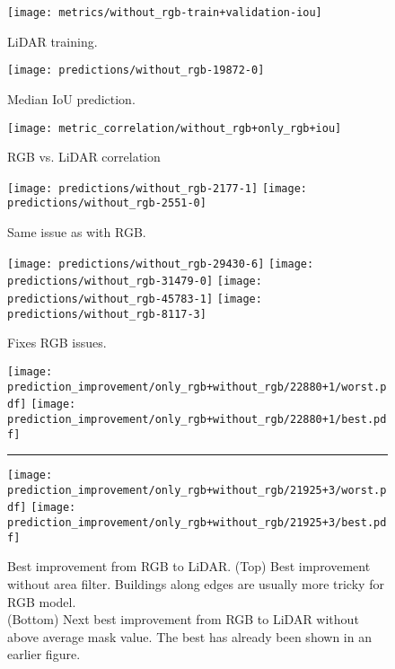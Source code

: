 \begin{figure}[H]
  \centering
  \texttt{[image: metrics/without\_rgb-train+validation-iou]}
  \caption{%
    LiDAR training.
  }%
  \label{fig:lidar-training}
\end{figure}

\begin{figure}[H]
  \centering
  \texttt{[image: predictions/without\_rgb-19872-0]}  %
  \caption{%
    Median IoU prediction.
  }%
  \label{fig:lidar-median-prediction}
\end{figure}

\begin{figure}[H]
  \centering
  \texttt{[image: metric\_correlation/without\_rgb+only\_rgb+iou]}
  \caption{%
    RGB vs. LiDAR correlation
  }%
  \label{fig:rgb-lidar-correlation}
\end{figure}

\begin{figure}[H]
  \centering
  \texttt{[image: predictions/without\_rgb-2177-1]}  %
  \texttt{[image: predictions/without\_rgb-2551-0]}  %
  \caption{%
    Same issue as with RGB.
  }%
  \label{fig:lidar-fundamental-issues}
\end{figure}

\begin{figure}[H]
  \centering
  \texttt{[image: predictions/without\_rgb-29430-6]}  %
  \texttt{[image: predictions/without\_rgb-31479-0]}  %
  \texttt{[image: predictions/without\_rgb-45783-1]}  %
  \texttt{[image: predictions/without\_rgb-8117-3]}  %
  \caption{%
    Fixes RGB issues.
  }%
  \label{fig:lidar-corrected-rgb}
\end{figure}

\begin{figure}[H]
  \centering
  \texttt{[image: prediction\_improvement/only\_rgb+without\_rgb/22880+1/worst.pdf]}
  \texttt{[image: prediction\_improvement/only\_rgb+without\_rgb/22880+1/best.pdf]}
  \rule[1ex]{\textwidth}{.5pt}
  \texttt{[image: prediction\_improvement/only\_rgb+without\_rgb/21925+3/worst.pdf]}
  \texttt{[image: prediction\_improvement/only\_rgb+without\_rgb/21925+3/best.pdf]}
  \caption{%
    Best improvement from RGB to LiDAR.
    (Top) Best improvement without area filter. Buildings along edges are usually more tricky for RGB model.
    \\
    (Bottom) Next best improvement from RGB to LiDAR without above average mask value.
    The best has already been shown in an earlier figure.
  }%
  \label{fig:lidar-better-than-rgb}
\end{figure}

